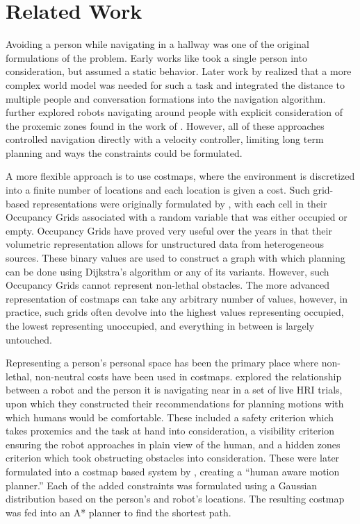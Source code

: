 \section{Related Work}
Avoiding a person while navigating in a hallway was one of the original formulations of the problem. Early works like \citet{yoda1997} took a single person into consideration, but assumed a static behavior. Later work by \citet{christensen2004} realized that a more complex world model was needed for such a task and integrated the distance to multiple people and conversation formations into the navigation algorithm. 
\citet{christensen2005} further explored robots navigating around people with explicit consideration of the proxemic zones found in the work of \citet{hall1969}. However, all of these approaches controlled navigation directly with a velocity controller, limiting long term planning and ways the constraints could be formulated. 

A more flexible approach is to use costmaps, where the environment is discretized into a finite number of locations and each location is given a cost. Such grid-based representations were originally formulated by \citet{matthies1988}, with each cell in their Occupancy Grids associated with a random variable that was either occupied or empty. Occupancy Grids have proved very useful over the years in that their volumetric representation allows for unstructured data from heterogeneous sources. These binary values are used to construct a graph with which planning can be done using Dijkstra's algorithm or any of its variants. However, such Occupancy Grids cannot represent non-lethal obstacles. The more advanced representation of costmaps can take any arbitrary number of values, however, in practice, such grids often devolve into the highest values representing occupied, the lowest representing unoccupied, and everything in between is largely untouched. 

Representing a person's personal space has been the primary place where non-lethal, non-neutral costs have been used in costmaps. \citet{dautenhahn:serveseated} %
explored the relationship between a robot and the person it is navigating near in a set of live HRI trials, upon which they constructed their recommendations for planning motions with which humans would be comfortable. These included a safety criterion which takes proxemics and the task at hand into consideration, a visibility criterion ensuring the robot approaches in plain view of the human, and a hidden zones criterion which took obstructing obstacles into consideration. These were later formulated into a costmap based system by \citet{sisbot2007}, creating a ``human aware motion planner.'' Each of the added constraints was formulated using a Gaussian distribution based on the person's and robot's locations. The resulting costmap was fed into an A* planner to find the shortest path. 


